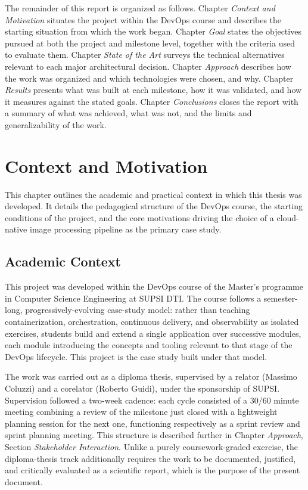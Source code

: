 \documentclass[twoside]{supsistudent}
\begin{document}
The remainder of this report is organized as follows. Chapter \emph{Context and Motivation} situates the project within the DevOps course and describes the starting situation from which the work began. Chapter \emph{Goal} states the objectives pursued at both the project and milestone level, together with the criteria used to evaluate them. Chapter \emph{State of the Art} surveys the technical alternatives relevant to each major architectural decision. Chapter \emph{Approach} describes how the work was organized and which technologies were chosen, and why. Chapter \emph{Results} presents what was built at each milestone, how it was validated, and how it measures against the stated goals. Chapter \emph{Conclusions} closes the report with a summary of what was achieved, what was not, and the limits and generalizability of the work.
\chapter{Context and Motivation}
This chapter outlines the academic and practical context in which this thesis was developed. It details the pedagogical structure of the DevOps course, the starting conditions of the project, and the core motivations driving the choice of a cloud-native image processing pipeline as the primary case study.

\section{Academic Context}
This project was developed within the DevOps course of the Master's programme in Computer Science Engineering at SUPSI DTI. The course follows a semester-long, progressively-evolving case-study model: rather than teaching containerization, orchestration, continuous delivery, and observability as isolated exercises, students build and extend a single application over successive modules, each module introducing the concepts and tooling relevant to that stage of the DevOps lifecycle. This project is the case study built under that model.

The work was carried out as a diploma thesis, supervised by a relator (Massimo Coluzzi) and a corelator (Roberto Guidi), under the sponsorship of SUPSI. Supervision followed a two-week cadence: each cycle consisted of a 30/60 minute meeting combining a review of the milestone just closed with a lightweight planning session for the next one, functioning respectively as a sprint review and sprint planning meeting. This structure is described further in Chapter \emph{Approach}, Section \emph{Stakeholder Interaction}. Unlike a purely coursework-graded exercise, the diploma-thesis track additionally requires the work to be documented, justified, and critically evaluated as a scientific report, which is the purpose of the present document.
\end{document}
